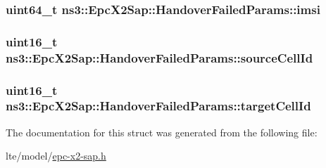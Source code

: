 \subsubsection[{\texorpdfstring{imsi}{imsi}}]{\setlength{\rightskip}{0pt plus 5cm}uint64\+\_\+t ns3\+::\+Epc\+X2\+Sap\+::\+Handover\+Failed\+Params\+::imsi}\hypertarget{structns3_1_1EpcX2Sap_1_1HandoverFailedParams_ace44d3a3caec19a22427034ed95e27d5}{}\label{structns3_1_1EpcX2Sap_1_1HandoverFailedParams_ace44d3a3caec19a22427034ed95e27d5}
\subsubsection[{\texorpdfstring{source\+Cell\+Id}{sourceCellId}}]{\setlength{\rightskip}{0pt plus 5cm}uint16\+\_\+t ns3\+::\+Epc\+X2\+Sap\+::\+Handover\+Failed\+Params\+::source\+Cell\+Id}\hypertarget{structns3_1_1EpcX2Sap_1_1HandoverFailedParams_a8a7ba9006e9f850c7dd56166036dc4de}{}\label{structns3_1_1EpcX2Sap_1_1HandoverFailedParams_a8a7ba9006e9f850c7dd56166036dc4de}
\subsubsection[{\texorpdfstring{target\+Cell\+Id}{targetCellId}}]{\setlength{\rightskip}{0pt plus 5cm}uint16\+\_\+t ns3\+::\+Epc\+X2\+Sap\+::\+Handover\+Failed\+Params\+::target\+Cell\+Id}\hypertarget{structns3_1_1EpcX2Sap_1_1HandoverFailedParams_ac095eb889d449376b59166f95253f329}{}\label{structns3_1_1EpcX2Sap_1_1HandoverFailedParams_ac095eb889d449376b59166f95253f329}


The documentation for this struct was generated from the following file\+:\begin{DoxyCompactItemize}
\item 
lte/model/\hyperlink{epc-x2-sap_8h}{epc-\/x2-\/sap.\+h}\end{DoxyCompactItemize}
